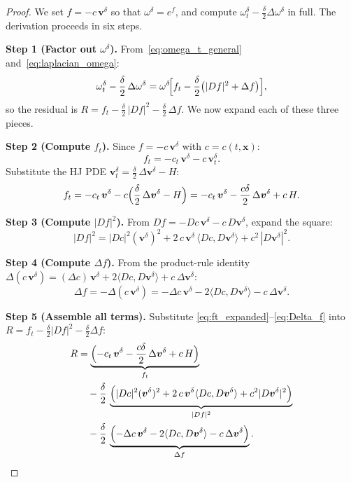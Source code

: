 \documentclass[11pt]{article}
\newcommand{\bx}{\bm{x}}
\newcommand{\bv}{\bm{v}}
\begin{document}
\begin{proof}
We set $f = -c\,\bv^\delta$ so that $\omega^\delta = e^f$, and compute
$\omega_t^\delta - \frac{\delta}{2}\Delta\omega^\delta$ in full.  The
derivation proceeds in six steps.

\medskip
\noindent\textbf{Step 1 (Factor out $\omega^\delta$).}
From~\eqref{eq:omega_t_general} and~\eqref{eq:laplacian_omega}:
\[
  \omega_t^\delta - \frac{\delta}{2}\,\Delta\omega^\delta
  = \omega^\delta\!\Bigl[
      f_t
      - \frac{\delta}{2}\bigl(|Df|^2 + \Delta f\bigr)
    \Bigr],
\]
so the residual is $R = f_t - \frac{\delta}{2}\,|Df|^2 - \frac{\delta}{2}\,\Delta f$.
We now expand each of these three pieces.

\medskip
\noindent\textbf{Step 2 (Compute $f_t$).}
Since $f = -c\,\bv^\delta$ with $c = c(t,\bx)$:
\[
  f_t = -c_t\,\bv^\delta - c\,\bv_t^\delta.
\]
Substitute the HJ PDE $\bv_t^\delta = \frac{\delta}{2}\,\Delta\bv^\delta - H$:
\begin{equation}\label{eq:ft_expanded}
  f_t
  = -c_t\,\bv^\delta - c\Bigl(\frac{\delta}{2}\,\Delta\bv^\delta - H\Bigr)
  = -c_t\,\bv^\delta
    - \frac{c\delta}{2}\,\Delta\bv^\delta
    + c\,H.
\end{equation}

\medskip
\noindent\textbf{Step 3 (Compute $|Df|^2$).}
From $Df = -Dc\,\bv^\delta - c\,D\bv^\delta$, expand the square:
\begin{equation}\label{eq:Df_sq}
  |Df|^2
  = |Dc|^2(\bv^\delta)^2
    + 2\,c\,\bv^\delta\,\langle Dc, D\bv^\delta\rangle
    + c^2\,|D\bv^\delta|^2.
\end{equation}

\medskip
\noindent\textbf{Step 4 (Compute $\Delta f$).}
From the product-rule identity
$\Delta(c\,\bv^\delta) = (\Delta c)\,\bv^\delta
  + 2\langle Dc, D\bv^\delta\rangle + c\,\Delta\bv^\delta$:
\begin{equation}\label{eq:Delta_f}
  \Delta f = -\Delta(c\,\bv^\delta)
  = -\Delta c\,\bv^\delta
    - 2\langle Dc, D\bv^\delta\rangle
    - c\,\Delta\bv^\delta.
\end{equation}

\medskip
\noindent\textbf{Step 5 (Assemble all terms).}
Substitute \eqref{eq:ft_expanded}--\eqref{eq:Delta_f} into
$R = f_t - \frac{\delta}{2}|Df|^2 - \frac{\delta}{2}\Delta f$:
\begin{align*}
  R &= \underbrace{
    \Bigl(-c_t\,\bv^\delta
    - \frac{c\delta}{2}\,\Delta\bv^\delta
    + c\,H\Bigr)}_{f_t} \\
  &\quad - \frac{\delta}{2}\,
    \underbrace{\Bigl(
      |Dc|^2(\bv^\delta)^2
      + 2\,c\,\bv^\delta\langle Dc, D\bv^\delta\rangle
      + c^2|D\bv^\delta|^2
    \Bigr)}_{|Df|^2} \\
  &\quad - \frac{\delta}{2}\,
    \underbrace{\Bigl(
      -\Delta c\,\bv^\delta
      - 2\langle Dc, D\bv^\delta\rangle
      - c\,\Delta\bv^\delta
    \Bigr)}_{\Delta f}.
\end{align*}


\end{proof}
\end{document}
